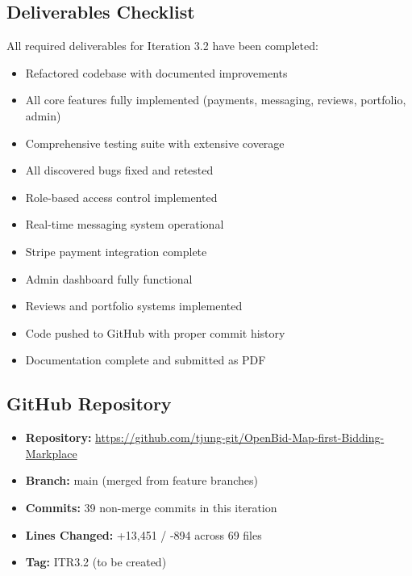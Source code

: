 \documentclass[11pt]{article}
\begin{document}
\subsection{Deliverables Checklist}
All required deliverables for Iteration 3.2 have been completed:
\begin{itemize}[leftmargin=1.4em]
  \item Refactored codebase with documented improvements
  \item All core features fully implemented (payments, messaging, reviews, portfolio, admin)
  \item Comprehensive testing suite with extensive coverage
  \item All discovered bugs fixed and retested
  \item Role-based access control implemented
  \item Real-time messaging system operational
  \item Stripe payment integration complete
  \item Admin dashboard fully functional
  \item Reviews and portfolio systems implemented
  \item Code pushed to GitHub with proper commit history
  \item Documentation complete and submitted as PDF
\end{itemize}

\subsection{GitHub Repository}
\begin{itemize}[leftmargin=1.4em]
  \item \textbf{Repository:} \url{https://github.com/tjung-git/OpenBid-Map-first-Bidding-Markplace}
  \item \textbf{Branch:} main (merged from feature branches)
  \item \textbf{Commits:} 39 non-merge commits in this iteration
  \item \textbf{Lines Changed:} +13,451 / -894 across 69 files
  \item \textbf{Tag:} ITR3.2 (to be created)
\end{itemize}
\end{document}

